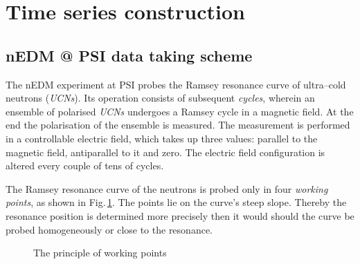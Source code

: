 \section{Time series construction}

\subsection{nEDM @ PSI data taking scheme}
The nEDM experiment at PSI probes the Ramsey resonance curve of ultra--cold neutrons (\emph{UCNs}). Its operation consists of subsequent \emph{cycles}, wherein an ensemble of polarised \emph{UCNs} undergoes a Ramsey cycle in a magnetic field. At the end the polarisation of the ensemble is measured. The measurement is performed in a controllable electric field, which takes up three values: parallel to the magnetic field, antiparallel to it and zero. The electric field configuration is altered every couple of tens of cycles.

The Ramsey resonance curve of the neutrons is probed only in four \emph{working points}, as shown in Fig.\,\ref{fig:axions_working_points}. The points lie on the curve's steep slope. Thereby the resonance position is determined more precisely then it would should the curve be probed homogeneously or close to the resonance.

\begin{figure}[bth]
  \myfloatalign
  \quad
  \caption{The principle of working points}
  \label{fig:axions_working_points}
\end{figure}


